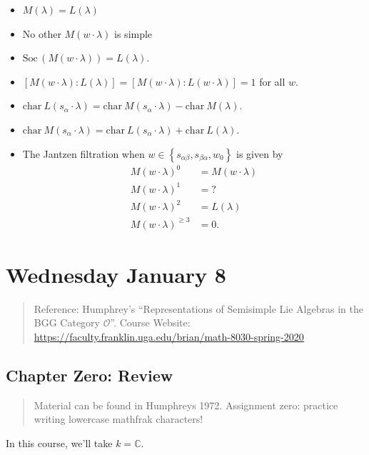 \documentclass[11pt]{scrartcl}
\theoremstyle{definition}
\theoremstyle{theorem}
\theoremstyle{proof}
\theoremstyle{definition}
\theoremstyle{break}
\theoremstyle{problem}
\providecommand{\tightlist}{%
  \setlength{\itemsep}{0pt}\setlength{\parskip}{0pt}}
\newcommand{\CC}[0]{{\mathbb{C}}}
\newcommand{\ch}[0]{\mathrm{char}~}
\newcommand{\soc}[0]{\mathrm{Soc}\,}
\newcommand{\theset}[1]{\left\{{#1}\right\}}
\begin{document}
\begin{itemize}
\tightlist
\item
  \(M(\lambda) = L(\lambda)\)
\item
  No other \(M(w\cdot \lambda)\) is simple
\item
  \(\soc(M(w\cdot \lambda)) = L(\lambda)\).
\item
  \([M(w\cdot \lambda) : L(\lambda)] = [M(w\cdot \lambda) : L(w\cdot \lambda)] = 1\)
  for all \(w\).
\item
  \(\ch L(s_\alpha \cdot \lambda) = \ch M(s_\alpha \cdot \lambda) - \ch M(\lambda)\).
\item
  \(\ch M(s_\alpha \cdot \lambda) = \ch L(s_\alpha \cdot \lambda) + \ch L(\lambda)\).
\item
  The Jantzen filtration when
  \(w \in \theset{s_{\alpha\beta}, s_{\beta\alpha}, w_0}\) is given by
  \begin{align*}
  M(w\cdot \lambda)^0 &= M(w\cdot \lambda) \\
  M(w\cdot \lambda)^1 &= ? \\
  M(w\cdot \lambda)^2 &= L(\lambda) \\
  M(w\cdot \lambda)^{\geq 3} &= 0
  .\end{align*}
\end{itemize}

\hypertarget{wednesday-january-8}{%
\section{Wednesday January 8}\label{wednesday-january-8}}

\begin{quote}
Reference: Humphrey's ``Representations of Semisimple Lie Algebras in
the BGG Category \(\mathcal{O}\)''. Course Website:
\url{https://faculty.franklin.uga.edu/brian/math-8030-spring-2020}
\end{quote}

\hypertarget{chapter-zero-review}{%
\subsection{Chapter Zero: Review}\label{chapter-zero-review}}

\begin{quote}
Material can be found in Humphreys 1972. Assignment zero: practice
writing lowercase mathfrak characters!
\end{quote}

In this course, we'll take \(k = \CC\).
\end{document}
